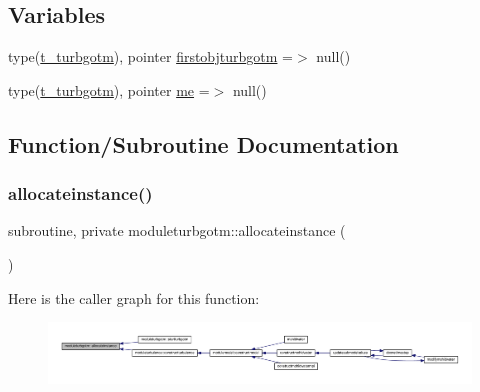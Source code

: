 \subsection*{Variables}
\begin{DoxyCompactItemize}
\item 
type(\mbox{\hyperlink{structmoduleturbgotm_1_1t__turbgotm}{t\+\_\+turbgotm}}), pointer \mbox{\hyperlink{namespacemoduleturbgotm_a16f7125a4269b004133d50c21b100a9d}{firstobjturbgotm}} =$>$ null()
\item 
type(\mbox{\hyperlink{structmoduleturbgotm_1_1t__turbgotm}{t\+\_\+turbgotm}}), pointer \mbox{\hyperlink{namespacemoduleturbgotm_ac86f138c93eff7a297646af1cbe15166}{me}} =$>$ null()
\end{DoxyCompactItemize}


\subsection{Function/\+Subroutine Documentation}
\mbox{\label{namespacemoduleturbgotm_a1f367dad0fd7a9dba96b5da89226bfdb}} 
\subsubsection{\texorpdfstring{allocateinstance()}{allocateinstance()}}
{\footnotesize\ttfamily subroutine, private moduleturbgotm\+::allocateinstance (\begin{DoxyParamCaption}{ }\end{DoxyParamCaption})\hspace{0.3cm}{\ttfamily [private]}}

Here is the caller graph for this function\+:\nopagebreak
\begin{figure}[H]
\begin{center}
\leavevmode
\includegraphics[width=350pt]{namespacemoduleturbgotm_a1f367dad0fd7a9dba96b5da89226bfdb_icgraph}
\end{center}
\end{figure}
\mbox{\label{namespacemoduleturbgotm_ad863a5918db79e19552388fff6750b22}} 
